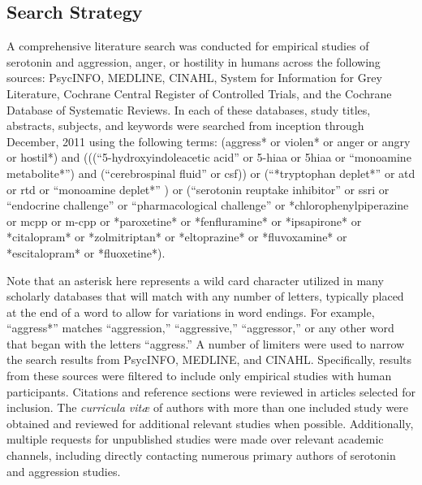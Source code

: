 \subsection{Search Strategy}
A comprehensive literature search was conducted for empirical studies of serotonin and aggression, anger, or hostility in humans across the following sources: PsycINFO, MEDLINE, CINAHL, System  for  Information  for  Grey Literature, Cochrane Central Register of Controlled Trials, and the Cochrane Database of Systematic Reviews. In each of these databases, study titles, abstracts, subjects, and keywords were searched from inception through December, 2011 using the following terms: \sc (aggress* or violen* or anger or angry or hostil*) and (((``5-hydroxy\-indole\-acetic acid'' or 5-hiaa or 5hiaa or ``mono\-amine metabo\-lite*'') and (``cerebro\-spinal fluid'' or csf)) or (``*tryptophan deplet*'' or atd or rtd or ``monoamine deplet*'' ) or (``serotonin reuptake inhibitor'' or ssri or ``endocrine challenge'' or ``pharmacological challenge'' or *chlorophenylpiperazine or mcpp or m-cpp or *paroxetine* or *fenfluramine* or *ipsapirone* or *citalopram* or *zolmitriptan* or *eltoprazine* or *fluvoxamine* or *escitalopram* or *fluoxetine*). \rm


Note that an asterisk here represents a wild card character utilized in many scholarly databases that will match with any number of letters, typically placed at the end of a word to allow for variations in word endings. For example, ``aggress*'' matches ``aggression,'' ``aggressive,'' ``aggressor,'' or any other word that began with the letters ``aggress.'' A number of limiters were used to narrow the search results from PsycINFO, MEDLINE, and CINAHL. Specifically, results from these sources were filtered to include only empirical studies with human participants. Citations and reference sections were reviewed in articles selected for inclusion. The \emph{curricula vit\ae} of authors with more than one included study were obtained  and reviewed for additional relevant studies when possible. Additionally, multiple requests for unpublished studies were made over relevant academic channels, including directly contacting numerous primary authors of serotonin and aggression studies.


